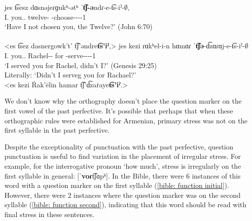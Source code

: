 \begin{exe}
	\ex 
	\begin{xlist}
		\ex \gll jes t͡sesz dɑsnəjeɾɡukʰ-ətʰ ˈ\textbf{t͡ʃ-ə}ndɾ-e-t͡s-iˀ-$\emptyset$, \\
		I.{\nom} you.{\pl}.{\acc} twelve-{\possSsg} {\neggloss}-choose-{\thgloss}-{\aorperf}-{\pst}-1{\sg}\\
		\trans `Have I not chosen you, the Twelve?' \hfill (John 6:70)  \label{bible:neg past perf vowel}
		\\
		 \\
		<es t͡sez dasnergowk't' t͡ʃ'əndre\textbf{t͡s'iˀ},>
		\ex \gll jes  kezi ɾɑkʰel-i-n hɑmɑɾ ˈ\textbf{t͡ʃə}-d͡zɑɾɑj-e-t͡s-iˀ-$\emptyset$ \\
		I.{\nom} you.{\sg}.{\dat} Rachel-{\dat}-{} for {\neggloss}-serve-{\thgloss}-{\aorperf}-{\pst}-1{\sg} \\
		\trans `I served you for Rachel, didn’t I?' \hfill (Genesis 29:25) \label{bible:neg past perf epen}
		\\
		Literally: `Didn't I serveg you for Rachael?' 
		\\ <es kezi \.{R}ak'ēlin hamar t͡ʃ'd͡za\.{r}aye\textbf{t͡s'iˀ}.>  
		
	\end{xlist}
\end{exe}

We don't know why the orthography doesn't place the question marker on the first vowel of the past perfective. It's possible that perhaps that when these orthographic rules were established for Armenian, primary stress was not on the first syllable in the past perfective.  

Despite the exceptionality of punctuation with the past perfective, question punctuation is useful to find variation in the placement of irregular stress. For example, for the interrogative pronoun `how much', stress is irregularly on the first syllable in general: [ˈ\textbf{voɾ}t͡ʃɑpʰ]. In the Bible, there were 6 instances of this word with a question marker on the first syllable (\ref{bible: function initial}). However, there were 2 instances where the question marker was on the second syllable (\ref{bible: function second}), indicating that this word should be read with final stress in these sentences. 


